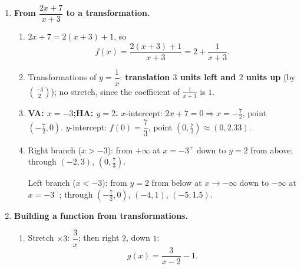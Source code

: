 \documentclass[12pt, twoside]{article}
\begin{document}
\begin{enumerate}[itemsep=0.3cm]
\begin{enumerate}[label=(\alph*), itemsep=0.2cm]
\begin{enumerate}[label=(\roman*), itemsep=0.15cm]
    \item \textbf{VA: $x=1$;\quad HA: $y=0$.}

    \item $x$-intercept: $-\dfrac{2}{x-1}=0$ has no solution $\Rightarrow$
    \textbf{no $x$-intercept}. $y$-intercept: $g(0)=\dfrac{-2}{-1}=2$, point $(0,2)$.

    \item Branch $x>1$: below the $x$-axis, from $-\infty$ at $x=1^+$ rising to $0^-$;
    through $(2,-2)$, $(3,-1)$, $(5,-0.5)$.

    Branch $x<1$: above the $x$-axis, from $0^+$ at $x\to-\infty$ rising to $+\infty$
    at $x=1^-$; through $(0,2)$, $(-1,1)$, $(-3,0.5)$.
  \end{enumerate}
\end{enumerate}

\medskip

\item \textbf{From $\dfrac{2x+7}{x+3}$ to a transformation.}

\begin{enumerate}[label=(\alph*), itemsep=0.2cm]
  \item $2x+7=2(x+3)+1$, so
  \[
  f(x)=\frac{2(x+3)+1}{x+3}=2+\frac{1}{x+3}.
  \]

  \item Transformations of $y=\dfrac{1}{x}$: \textbf{translation $3$ units left and
  $2$ units up} (by $\binom{-3}{2}$); no stretch, since the coefficient of
  $\tfrac{1}{x+3}$ is $1$.

  \item \textbf{VA: $x=-3$;\quad HA: $y=2$.}
  $x$-intercept: $2x+7=0\Rightarrow x=-\tfrac72$, point $\left(-\tfrac72,0\right)$.
  $y$-intercept: $f(0)=\dfrac{7}{3}$, point $\left(0,\tfrac73\right)\approx(0,2.33)$.

  \item Right branch ($x>-3$): from $+\infty$ at $x=-3^+$ down to $y=2$ from above;
  through $(-2,3)$, $\left(0,\tfrac73\right)$.

  Left branch ($x<-3$): from $y=2$ from below at $x\to-\infty$ down to $-\infty$ at
  $x=-3^-$; through $\left(-\tfrac72,0\right)$, $(-4,1)$, $(-5,1.5)$.
\end{enumerate}

\medskip

\item \textbf{Building a function from transformations.}

\begin{enumerate}[label=(\alph*), itemsep=0.2cm]
  \item Stretch $\times 3$: $\dfrac{3}{x}$; then right $2$, down $1$:
  \[
  g(x)=\frac{3}{x-2}-1.
  \]


\end{enumerate}
\end{enumerate}
\end{document}
